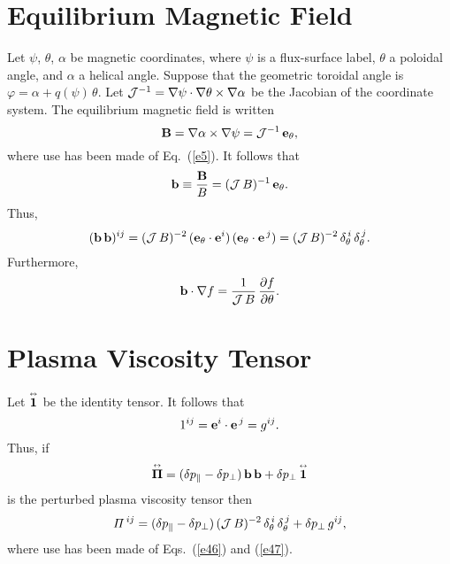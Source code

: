 \documentclass[12pt,prb,aps,notitlepage]{revtex4-1}
\newcommand{\bPi}{\mbox{\boldmath$\Pi$}}
\newcommand{\smalltensor}[1]{\overset{\text{\tiny$\leftrightarrow$}}{#1}}
\begin{document}
\section{Equilibrium Magnetic Field}
Let $\psi$, $\theta$, $\alpha$ be magnetic coordinates, where $\psi$ is a flux-surface label, $\theta$ a poloidal angle, and $\alpha$
a helical angle. Suppose that the geometric toroidal angle is $\varphi = \alpha+ q(\psi)\,\theta$. 
 Let ${\cal  J}^{-1}= \nabla\psi\cdot\nabla\theta\times \nabla\alpha$ be the Jacobian of the coordinate system. The equilibrium magnetic field
is written 
\begin{equation}\label{e44}
{\bf B} =  \nabla\alpha\times\nabla\psi={\cal J}^{-1}\,{\bf e}_\theta,
\end{equation}
where use has been made of Eq.~(\ref{e5}). 
It follows that 
\begin{equation}\label{e45}
{\bf b} \equiv \frac{{\bf B}}{B}= ({\cal J}\,B)^{-1}\,{\bf e}_\theta.
\end{equation}
Thus,
\begin{equation}\label{e46}
({\bf b}\,{\bf b})^{ij}= ({\cal J}\,B)^{-2} \,({\bf e}_\theta\cdot{\bf e}^i)\,({\bf e}_\theta\cdot{\bf e}^{\,j})=  ({\cal J}\,B)^{-2} \,\delta_\theta^{\,i}\,\delta_\theta^{\,j}.
\end{equation}
Furthermore,
\begin{equation}\label{e48a}
{\bf b}\cdot\nabla f = \frac{1}{{\cal J}\,B}\,\frac{\partial f}{\partial\theta}.
\end{equation}

\section{Plasma Viscosity Tensor}
Let $\smalltensor{\bf 1}$ be the identity tensor. It follows that
\begin{equation}\label{e47}
1^{ij}= {\bf e}^i\cdot{\bf e}^{\,j} = g^{ij}.
\end{equation}
Thus, if 
\begin{equation}
\smalltensor{\bPi}= (\delta p_\parallel-\delta p_\perp)\,{\bf b}\,{\bf b} + \delta p_\perp\,\smalltensor{\bf 1}
\end{equation}
is the perturbed plasma viscosity tensor then
\begin{equation}\label{e48}
{\mit\Pi}^{\,ij} = (\delta p_\parallel-\delta p_\perp)\,({\cal J}\,B)^{-2} \,\delta_\theta^{\,i}\,\delta_\theta^{\,j} +\delta p_\perp\,g^{ij},
\end{equation}
where use has been made of Eqs.~(\ref{e46}) and (\ref{e47}). 
\end{document}

